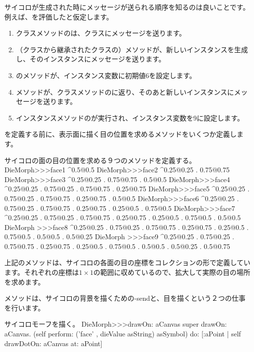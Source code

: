 \documentclass[a4paper,10pt,twoside]{book}
\begin{document}
サイコロが生成された時にメッセージが送られる順序を知るのは良いことです。
例えば、を評価したと仮定します。
\begin{enumerate}
	\item クラスメソッドのは、クラスにメッセージを送ります。
	\item （クラスから継承されたクラスの）メソッドが、新しいインスタンスを生成し、そのインスタンスにメッセージを送ります。
	\item {}のメソッドが、インスタンス変数に初期値6を設定します。
	\item {}メソッドが、クラスメソッドのに返り、そのあと新しいインスタンスにメッセージを送ります。 
	\item インスタンスメソッドのが実行され、インスタンス変数を9に設定します。
\end{enumerate}

を定義する前に、表示面に描く目の位置を求めるメソッドをいくつか定義します。
\begin{methods}{サイコロの面の目の位置を求める９つのメソッドを定義する。}
DieMorph>>>face1
	^{0.5@0.5}
DieMorph>>>face2
	^{0.25@0.25 . 0.75@0.75}
DieMorph>>>face3
	^{0.25@0.25 . 0.75@0.75 . 0.5@0.5}
DieMorph>>>face4
	^{0.25@0.25 . 0.75@0.25 . 0.75@0.75 . 0.25@0.75}
DieMorph>>>face5
	^{0.25@0.25 . 0.75@0.25 . 0.75@0.75 . 0.25@0.75 . 0.5@0.5}
DieMorph>>>face6
	^{0.25@0.25 . 0.75@0.25 . 0.75@0.75 . 0.25@0.75 . 0.25@0.5 . 0.75@0.5}
DieMorph>>>face7
	^{0.25@0.25 . 0.75@0.25 . 0.75@0.75 . 0.25@0.75 . 0.25@0.5 . 0.75@0.5 . 0.5@0.5}
DieMorph >>>face8
	^{0.25@0.25 . 0.75@0.25 . 0.75@0.75 . 0.25@0.75 . 0.25@0.5 . 0.75@0.5 . 0.5@0.5 . 0.5@0.25}
DieMorph >>>face9
	^{0.25@0.25 . 0.75@0.25 . 0.75@0.75 . 0.25@0.75 . 0.25@0.5 . 0.75@0.5 . 0.5@0.5 . 0.5@0.25 . 0.5@0.75}
\end{methods}

上記のメソッドは、サイコロの各面の目の座標をコレクションの形で定義しています。それぞれの座標は$1\times1$の範囲に収めているので、拡大して実際の目の場所を求めます。

メソッドは、サイコロの背景を描くための-sendと、目を描くという２つの仕事を行います。
\begin{method}{サイコロモーフを描く。}
DieMorph>>>drawOn: aCanvas
	super drawOn: aCanvas.
	(self perform: ('face' , dieValue asString) asSymbol)
		do: [:aPoint | self drawDotOn: aCanvas at: aPoint]
\end{method}
\end{document}
